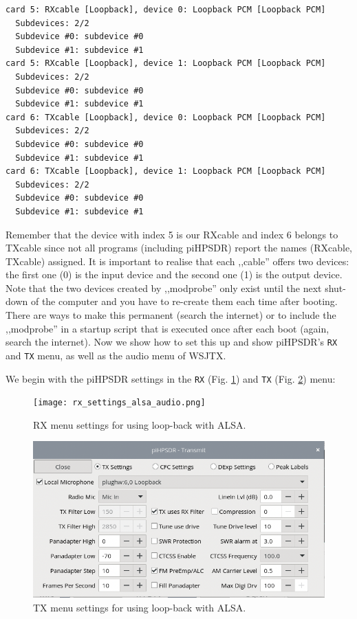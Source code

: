 \documentclass[12pt]{book}
\def\bltt#1{\texttt{\color{blue}#1}}
\def\pH{pi\-HPSDR\xspace}
\begin{document}
\begin{small}
\begin{verbatim}
card 5: RXcable [Loopback], device 0: Loopback PCM [Loopback PCM]
  Subdevices: 2/2
  Subdevice #0: subdevice #0
  Subdevice #1: subdevice #1
card 5: RXcable [Loopback], device 1: Loopback PCM [Loopback PCM]
  Subdevices: 2/2
  Subdevice #0: subdevice #0
  Subdevice #1: subdevice #1
card 6: TXcable [Loopback], device 0: Loopback PCM [Loopback PCM]
  Subdevices: 2/2
  Subdevice #0: subdevice #0
  Subdevice #1: subdevice #1
card 6: TXcable [Loopback], device 1: Loopback PCM [Loopback PCM]
  Subdevices: 2/2
  Subdevice #0: subdevice #0
  Subdevice #1: subdevice #1
\end{verbatim}
\end{small}
Remember that the device with index 5 is our RXcable and index 6 belongs to TXcable since
not all programs (including \pH) report the names (RXcable, TXcable) assigned. It is
important to realise that each ,,cable'' offers two devices: the first one (0) is
the input device and the second one (1) is the output device.
Note that
the two devices created by ,,modprobe'' only exist until the next shut-down of the computer and
you have to re-create them each time after booting. There are ways to make this permanent (search
the internet) or to include the ,,modprobe'' in a startup script that is executed once after each
boot (again, search the internet). Now we show how to set this up and show \pH's \bltt{RX} and
\bltt{TX} menu, as well as the audio menu of WSJTX.

We begin with the \pH settings in the \bltt{RX} (Fig. \ref{fig:rx_settings_alsa_audio}) and
\bltt{TX} (Fig. \ref{fig:tx_settings_alsa_audio}) menu:

\begin{figure}[ht]
\center
\texttt{[image: rx\_settings\_alsa\_audio.png]}
\caption{RX menu settings for using loop-back with ALSA.}
\label{fig:rx_settings_alsa_audio}
\end{figure}

\begin{figure}[ht]
\center
\includegraphics[scale=0.45]{tx_settings_alsa_audio.png}
\caption{TX menu settings for using loop-back with ALSA.}
\label{fig:tx_settings_alsa_audio}
\end{figure}
\end{document}
